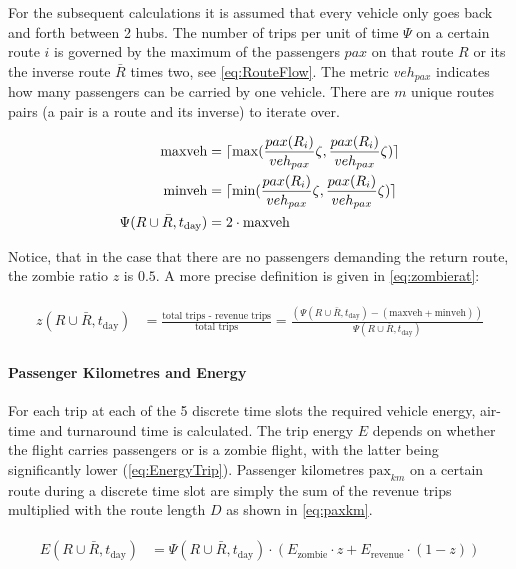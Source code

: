 For the subsequent calculations it is assumed that every vehicle only goes back and forth between 2 hubs. The number of trips per unit of time $\Psi$ on a certain route $i$ is governed by the maximum of the passengers $pax$ on that route $R$ or its the inverse route $\bar{R}$ times two, see \autoref{eq:RouteFlow}. The metric $veh_{pax}$ indicates how many passengers can be carried by one vehicle. There are $m$ unique routes pairs (a pair is a route and its inverse) to iterate over.

\begin{align} \label{eq:RouteFlow}
    \text{maxveh} &= \lceil \max( \frac{pax(R_i)}{veh_{pax}} \zeta, \frac{pax(R_i)}{veh_{pax}}\zeta ) \rceil\\
    \text{minveh} &= \lceil \min( \frac{pax(R_i)}{veh_{pax}} \zeta, \frac{pax(R_i)}{veh_{pax}}\zeta ) \rceil\\
    \Psi(R\cup\bar{R}, t_{\text{day}}) &= 2\cdot \text{maxveh}
\end{align}

Notice, that in the case that there are no passengers demanding the return route, the zombie ratio $z$ is $0.5$. A more precise definition is given in \autoref{eq:zombierat}:

\begin{align} \label{eq:zombierat}
\begin{split}
    z(R\cup\bar{R}, t_{\text{day}}) &= \frac{\text{total trips - revenue trips}}{\text{total trips}} = \frac{(\Psi(R\cup\bar{R}, t_{\text{day}}) - (\text{maxveh} + \text{minveh}))}{\Psi(R\cup\bar{R}, t_{\text{day}})}
\end{split}
\end{align}


\paragraph{Passenger Kilometres and Energy}

For each trip at each of the 5 discrete time slots the required vehicle energy, air-time and turnaround time is calculated. The trip energy $E$ depends on whether the flight carries passengers or is a zombie flight, with the latter being significantly lower (\autoref{eq:EnergyTrip}). Passenger kilometres $\text{pax}_{km}$ on a certain route during a discrete time slot are simply the sum of the revenue trips multiplied with the route length $D$ as shown in \autoref{eq:paxkm}.

\begin{align} \label{eq:EnergyTrip}
\begin{split}
    E(R\cup\bar{R}, t_{\text{day}}) &= \Psi(R\cup\bar{R}, t_{\text{day}}) \cdot \left(E_{\text{zombie}} \cdot z + E_{\text{revenue}} \cdot (1-z) \right)
\end{split}
\end{align}

